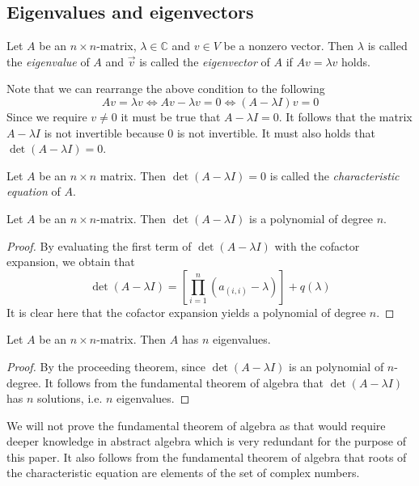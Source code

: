 \subsection{Eigenvalues and eigenvectors}
\begin{definition}
	Let $A$ be an $n\times n$-matrix, $\lambda \in \mathbb C$ and $v\in V$ be a nonzero vector. Then $\lambda$ is called the \emph{eigenvalue} of $A$ and $\vec{v}$ is called the \emph{eigenvector} of $A$ if $Av = \lambda v$ holds.
\end{definition}
Note that we can rearrange the above condition to the following
$$
Av = \lambda v \iff Av - \lambda v = 0 \iff \left(A - \lambda I\right)v = 0
$$
Since we require $v \neq 0$ it must be true that $A - \lambda I = 0$. It follows that the matrix $A - \lambda I$ is not invertible because $0$ is not invertible. It must also holds that $\det\left(A - \lambda I\right) = 0$.
\begin{definition}
	Let $A$ be an $n\times n$ matrix. Then $\det\left(A - \lambda I\right) = 0$ is called the \emph{characteristic equation} of $A$.
\end{definition}
\begin{theorem}
	Let $A$ be an $n\times n$-matrix. Then $\det\left(A - \lambda I\right)$ is a polynomial of degree $n$.
	\begin{proof}
		By evaluating the first term of $\det\left(A - \lambda I \right)$ with the cofactor expansion, we obtain that
		$$
		\det\left(A - \lambda I \right) = \left[\prod_{i = 1}^n (a_{(i,i)} - \lambda)\right] + q(\lambda)
		$$
		It is clear here that the cofactor expansion yields a polynomial of degree $n$.
	\end{proof}
\end{theorem}
\begin{corollary}
	Let $A$ be an $n\times n$-matrix. Then $A$ has $n$ eigenvalues.
	\begin{proof}
		By the proceeding theorem, since $\det(A - \lambda I)$ is an polynomial of $n$-degree. It follows from the fundamental theorem of algebra that $\det(A - \lambda I)$ has $n$ solutions, i.e. $n$ eigenvalues.
	\end{proof}
\end{corollary}
We will not prove the fundamental theorem of algebra as that would require deeper knowledge in abstract algebra which is very redundant for the purpose of this paper. It also follows from the fundamental theorem of algebra that roots of the characteristic equation are elements of the set of complex numbers.
